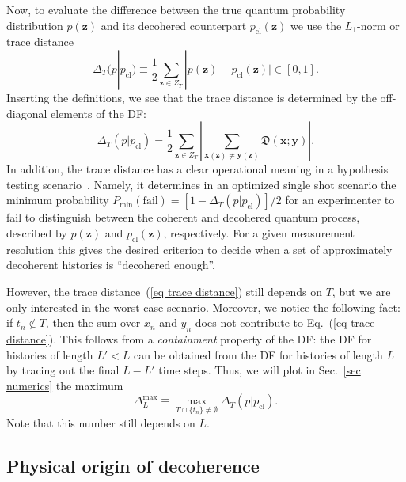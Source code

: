 \documentclass[pre,onecolumn,12pt,aps,longbibliography,nofootinbib]{revtex4-2}
\newcommand{\bb}[1]{\textbf{#1}}
\newcommand{\mf}[1]{{\mathfrak{#1}}}
\newcommand{\new}[1]{#1}
\begin{document}
Now, to evaluate the difference between the true quantum probability distribution $p(\bb z)$ and its decohered counterpart $p_\text{cl}(\bb z)$ we use the $L_1$-norm or trace distance
\begin{equation}\label{eq trace distance}
 \Delta_T(p|p_\text{cl}) \equiv \frac{1}{2}\sum_{\bb z\in Z_T} |p(\bb z)-p_\text{cl}(\bb z)| \in[0,1].
\end{equation}
Inserting the definitions, we see that the trace distance is determined by the off-diagonal elements of the DF:
\begin{equation}
 \Delta_T(p|p_\text{cl}) = \frac{1}{2}\sum_{\bb z\in Z_T} \left|\sum_{\bb x(\bb z)\neq\bb y(\bb z)} \mf{D}(\bb x;\bb y)\right|.
\end{equation}
In addition, the trace distance has a clear operational meaning in a hypothesis testing scenario~\cite{WildeBook2019}. Namely, it determines in an optimized single shot scenario the minimum probability $P_\text{min}(\text{fail}) = [1-\Delta_T(p|p_\text{cl})]/2$ for an experimenter to fail to distinguish between the coherent and decohered quantum process, described by $p(\bb z)$ and $p_\text{cl}(\bb z)$, respectively. For a given measurement resolution this gives the desired criterion to decide when a set of approximately decoherent histories is ``decohered enough''.

However, the trace distance~(\ref{eq trace distance}) still depends on $T$, but we are only interested in the worst case scenario. Moreover, we notice the following fact: if $t_n\notin T$, then the sum over $x_n$ and $y_n$ does not contribute to Eq.~(\ref{eq trace distance}). This follows from a \emph{containment} property of the DF: the DF for histories of length $L'<L$ can be obtained from the DF for histories of length $L$ by tracing out the final $L-L'$ time steps. Thus, we will plot in Sec.~\ref{sec numerics} the maximum
\begin{equation}\label{eq TD max}
 \Delta^\text{max}_L \equiv \max_{T\cap\{t_n\}\neq\emptyset} \Delta_T(p|p_\text{cl}).
\end{equation}
Note that this number still depends on $L$.

\subsection{\new{Physical origin of decoherence}}
\label{sec physical origin}
\end{document}

